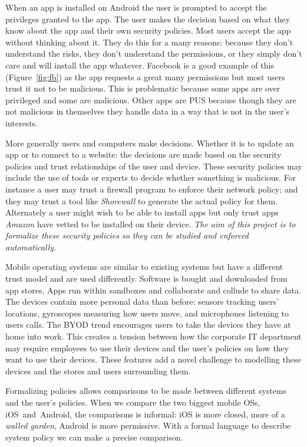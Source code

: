 \documentclass[a4paper,sfsidenotes]{tufte-book}
\begin{document}
When an app is installed on Android the user is prompted to accept the
privileges granted to the app.  The user makes the decision based on what they
know about the app and their own security policies.  Most users accept the
app without thinking about it.  They do this for a many reasons: because they don't
understand the risks, they don't understand the permissions, or they simply
don't care and will install the app whatever. Facebook is a good example of this
(Figure~\ref{fig:fb}) as the app requests a great many permissions but most
users trust it not to be malicious.  This is problematic because some apps are over
privileged\cite{Felt:2011kj} and some are malicious\cite{Zhou:2012cf}.  Other
apps are \ac{PUS} because though they are not malicious in
themselves they handle data in a way that is not in the user's interests.

More generally users and computers make decisions. Whether it is to update an
app or to connect to a website: the decisions are made based on the security
policies and trust relationships of the user and device.  These security
policies may include the use of tools or experts to decide whether something is
malicious.  For instance a user may trust a firewall program to enforce their
network policy; and they may trust a tool like \emph{Shorewall} to generate the
actual policy for them.  Alternately a user might wish to be able to install
apps but only trust apps \emph{Amazon} have vetted to be installed on their
device.  \emph{The aim of this project is to formalize these security policies
  so they can be studied and enforced automatically.}

Mobile operating systems are similar to existing systems but have a
different trust model and are used differently.  Software is
bought and downloaded from app stores, Apps run within sandboxes and collaborate and
collude to share data. The devices contain more personal data
than before: sensors tracking users' locations,  gyroscopes measuring how
users move, and microphones listening to users calls.  The \ac{BYOD} trend
encourages users to take the devices they have at home into work.
This creates a tension between how the corporate IT department may require
employees to use their devices and the user's policies on how they want to use
their devices.  These features add a novel challenge to modelling these devices
and the stores and users surrounding them.  

Formalizing policies allows comparisons to be made between different systems
and the user's policies.  When we compare the two biggest mobile OSs,
iOS~and~Android, the comparisons is informal: iOS is more closed, more of
a \emph{walled garden}, Android is more permissive.  With a formal language to
describe system policy we can make a precise comparison. 
\end{document}

